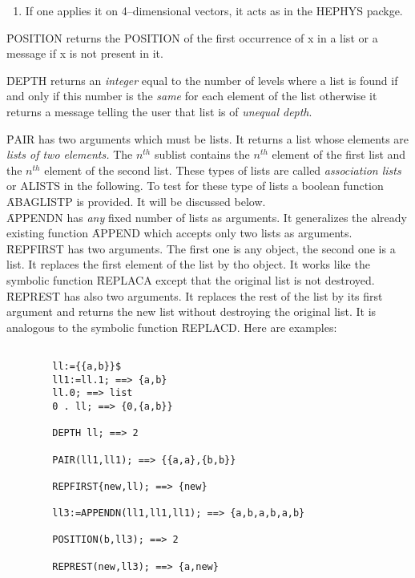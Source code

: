 \begin{itemize}
\begin{enumerate}
\begin{verbatim}
         {a,b,c}.2; ==> b

\end{verbatim}
\item If one applies it on 4--dimensional vectors, it acts as in the
HEPHYS packge.
\end{enumerate}
\f{POSITION} returns the POSITION of the first occurrence of x in
a list or a message if x is not present in it.

\f{DEPTH} returns an {\em integer} equal to the number of levels where a
   list is found if and only if this number is the {\em same} for each
   element of the list  otherwise it returns a message telling the user
   that list is of {\em unequal depth}.

\f{PAIR} has two arguments which must be lists. It returns a list
whose elements are {\em lists of two elements.}
The $n^{th}$ sublist contains the $n^{th}$ element of the first list
and the $n^{th}$ element of the second list. These types of lists are called
{\em association lists} or ALISTS in the following.
To test for these type of lists a boolean function \f{ABAGLISTP}
is provided. It will be discussed below.\\
\f{APPENDN} has {\em any} fixed number of lists as arguments. It
generalizes the already existing function \f{APPEND} which accepts
only two lists as arguments. \\
\f{REPFIRST} has two arguments. The first one is any object, the second one
is a list. It replaces the first element of the list by tho object. It
works like the symbolic function \f{REPLACA} except that the
original list is not destroyed.\\
\f{REPREST} has also two arguments. It replaces the rest of the list by
its first argument and returns the new list without destroying the
original list. It is analogous to the symbolic function \f{REPLACD}.
Here are examples:
\begin{verbatim}

        ll:={{a,b}}$
        ll1:=ll.1; ==> {a,b}
        ll.0; ==> list
        0 . ll; ==> {0,{a,b}}

        DEPTH ll; ==> 2

        PAIR(ll1,ll1); ==> {{a,a},{b,b}}

        REPFIRST{new,ll); ==> {new}

        ll3:=APPENDN(ll1,ll1,ll1); ==> {a,b,a,b,a,b}

        POSITION(b,ll3); ==> 2

        REPREST(new,ll3); ==> {a,new}


\end{verbatim}
\end{itemize}
